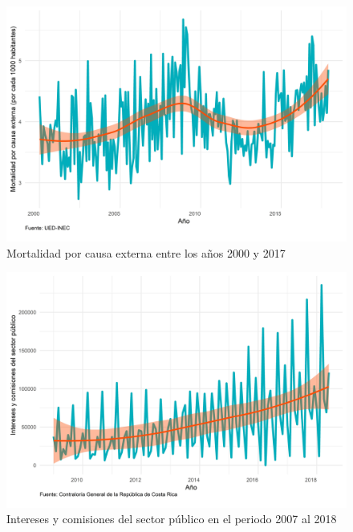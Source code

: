 \documentclass[
]{article}
\begin{document}
\begin{figure}[H]
\includegraphics[width=1\linewidth,height=1\textheight]{Tesis_files/figure-latex/externaplotgeneral-1} \caption{Mortalidad por causa externa entre los años 2000 y 2017}\label{fig:externaplotgeneral}
\end{figure}

\begin{figure}[H]
\includegraphics[width=1\linewidth,height=1\textheight]{Tesis_files/figure-latex/interesesplotgeneral-1} \caption{Intereses y comisiones del sector público en el periodo 2007 al 2018}\label{fig:interesesplotgeneral}
\end{figure}
\end{document}
